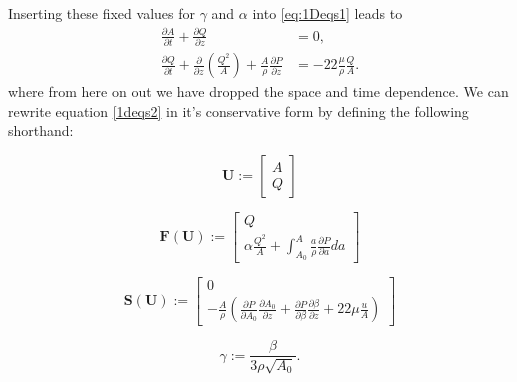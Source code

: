 \documentclass[a4paper, oneside]{discothesis}
\begin{document}
Inserting these fixed values for $\gamma$ and $\alpha$ into  \autoref{eq:1Deqs1} leads to 
\begin{equation}
	\begin{aligned} 
		\frac{\partial A}{\partial t} + \frac{\partial Q}{\partial z} &= 0, \\ 
		\frac{\partial Q}{\partial t} + \frac{\partial}{\partial z}\left(\frac{Q^2}{A} \right) + \frac{A}{\rho} \frac{\partial P}{\partial z} &= -22 \frac{\mu}{\rho} \frac{Q}{A}.
	\end{aligned} \label{1deqs2}
\end{equation}
where from here on out we have dropped the space and time dependence.
We can rewrite equation \ref{1deqs2} in it's conservative form by defining the following shorthand:

\begin{equation}
	\mathbf{U} := 
	\begin{bmatrix}
		A \\
		Q
	\end{bmatrix}
\end{equation}

\begin{equation}
	\mathbf{F} \left( \mathbf{U} \right) := 
	\begin{bmatrix}
		Q \\
		\alpha \frac{Q^2}{A} + \int_{A_0}^{A} \frac{a}{\rho}\frac{\partial P}{\partial a} da
	\end{bmatrix}
\end{equation}

\begin{equation}
	\mathbf{S} \left( \mathbf{U} \right) := 
	\begin{bmatrix}
		0 \\
		-\frac{A}{\rho} \left( \frac{\partial P}{\partial A_0} \frac{\partial A_0}{\partial z} + \frac{\partial P}{\partial \beta} \frac{\partial \beta}{\partial z} + 22\mu\frac{u}{A} \right)
	\end{bmatrix}
\end{equation}

\begin{equation}
	\gamma := \frac{\beta}{3\rho\sqrt{A_0}}.
\end{equation}
\end{document}
